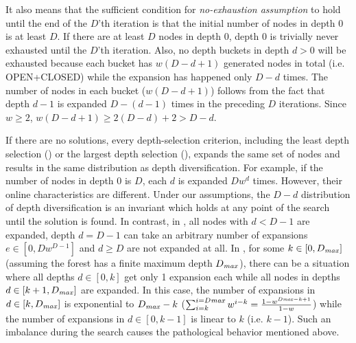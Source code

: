 It also means that the sufficient condition for \emph{no-exhaustion assumption} to hold until the end of the $D$'th
iteration is that the initial number of nodes in depth 0 is at least $D$.  If there are at least $D$ nodes in depth
0, depth 0 is trivially never exhausted until the $D$'th iteration. Also, no depth buckets in depth $d>0$ will be exhausted 
because each bucket has $w(D-d+1)$ generated nodes in total (i.e. OPEN+CLOSED) while the expansion has
happened only $D-d$ times.
The number of nodes in each bucket ($w(D-d+1)$) follows from the fact that  depth $d-1$ is expanded $D-(d-1)$ times in the preceding $D$ iterations.
Since $w\geq 2$, $w(D-d+1)\geq 2(D-d)+2>D-d$.

If there are no solutions, every depth-selection criterion, including the least depth selection (\fifo) or the largest depth selection (\lifo), expands the same set of nodes and results in the same distribution as depth diversification.
For example, if the number of nodes in depth 0 is $D$, each $d$ is expanded $Dw^d$ times.
However, their online characteristics are different.
Under our assumptions, the $D-d$ distribution of depth diversification is an invariant which holds at any point of the search until the solution is found.
In contrast, in \fifo, all nodes with $d<D-1$ are expanded, depth $d=D-1$ can take an arbitrary number of expansions $e \in [0, Dw^{D-1}]$ and $d\geq D$ are not expanded at all.
In \lifo, for some $k\in [0,D_\mit{max}]$ (assuming the forest has a finite maximum depth $D_\mit{max}$), there can be a situation where all depths $d \in [0,k]$ get only 1 expansion each
while all nodes in depths $d \in [k+1,D_\mit{max}]$ are expanded. In this case, the number of expansions in $d \in [k,D_\mit{max}]$ is exponential to $D_\mit{max}-k$ ($\sum_{i=k}^{i=D\mit{max}}w^{i-k}=\frac{1-w^{D\mit{max}-k+1}}{1-w}$) while the number of expansions in $d \in [0,k-1]$ is linear to $k$ (i.e. $k-1$). Such an imbalance during the search causes the pathological behavior mentioned above.


